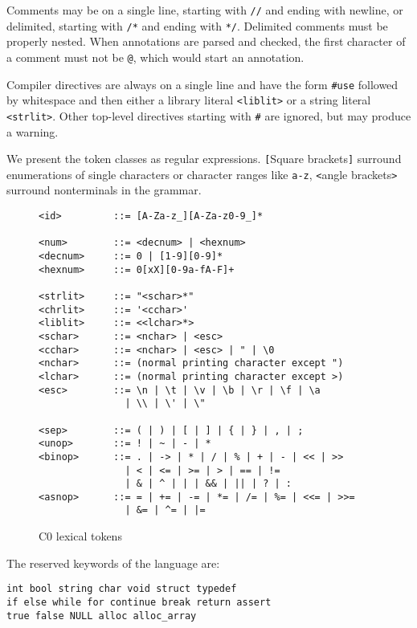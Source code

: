\documentclass[11pt]{article}
\begin{document}
Comments may be on a single line, starting with \verb'//'
and ending with newline, or delimited, starting with
\verb'/*' and ending with \verb'*/'.  Delimited comments
must be properly nested.  When annotations are parsed and
checked, the first character of a comment must not be
\verb'@', which would start an annotation.

Compiler directives are always on a single line and have the form
\verb'#use' followed by whitespace and then either a library literal
\verb'<liblit>' or a string literal \verb'<strlit>'.  Other
top-level directives starting with \verb'#' are ignored, but
may produce a warning.

We present the token classes as regular expressions.  \verb'['Square
brackets\verb']' surround enumerations of single characters or
character ranges like \verb'a-z', \verb'<'angle brackets\verb'>'
surround nonterminals in the grammar.

\begin{figure}
\begin{small}
\begin{verbatim}
<id>         ::= [A-Za-z_][A-Za-z0-9_]*

<num>        ::= <decnum> | <hexnum>
<decnum>     ::= 0 | [1-9][0-9]*
<hexnum>     ::= 0[xX][0-9a-fA-F]+

<strlit>     ::= "<schar>*"
<chrlit>     ::= '<cchar>'
<liblit>     ::= <<lchar>*>
<schar>      ::= <nchar> | <esc>
<cchar>      ::= <nchar> | <esc> | " | \0
<nchar>      ::= (normal printing character except ")
<lchar>      ::= (normal printing character except >)
<esc>        ::= \n | \t | \v | \b | \r | \f | \a 
               | \\ | \' | \"

<sep>        ::= ( | ) | [ | ] | { | } | , | ;
<unop>       ::= ! | ~ | - | *
<binop>      ::= . | -> | * | / | % | + | - | << | >> 
               | < | <= | >= | > | == | !=
               | & | ^ | | | && | || | ? | :
<asnop>      ::= = | += | -= | *= | /= | %= | <<= | >>=
               | &= | ^= | |=
\end{verbatim}
\end{small}
\caption{C0 lexical tokens}
\label{fig:tokens}
\end{figure}

The reserved keywords of the language are:
\begin{verbatim}
int bool string char void struct typedef
if else while for continue break return assert
true false NULL alloc alloc_array
\end{verbatim}
\end{document}
